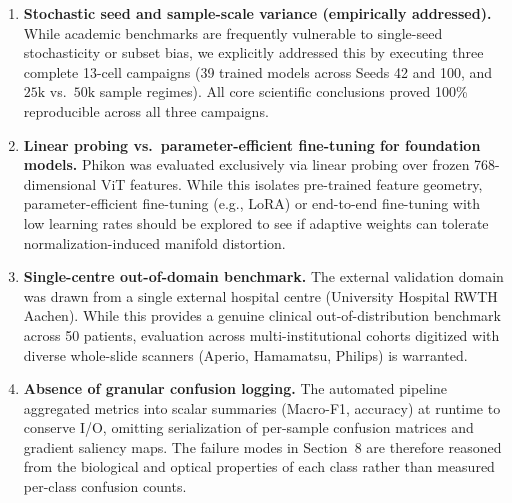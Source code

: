\documentclass[11pt,a4paper]{article}
\begin{document}
\begin{enumerate}
  \item \textbf{Stochastic seed and sample-scale variance (empirically addressed).}
        While academic benchmarks are frequently vulnerable to single-seed stochasticity
        or subset bias, we explicitly addressed this by executing three complete 13-cell
        campaigns (39 trained models across Seeds 42 and 100, and $25\text{k}$ vs.\
        $50\text{k}$ sample regimes). All core scientific conclusions proved 100\%
        reproducible across all three campaigns.
  \item \textbf{Linear probing vs.\ parameter-efficient fine-tuning for foundation
        models.} Phikon was evaluated exclusively via linear probing over frozen
        768-dimensional ViT features. While this isolates pre-trained feature geometry,
        parameter-efficient fine-tuning (e.g., LoRA) or end-to-end fine-tuning with low
        learning rates should be explored to see if adaptive weights can tolerate
        normalization-induced manifold distortion.
  \item \textbf{Single-centre out-of-domain benchmark.} The external validation domain
        was drawn from a single external hospital centre (University Hospital RWTH
        Aachen). While this provides a genuine clinical out-of-distribution benchmark
        across 50 patients, evaluation across multi-institutional cohorts digitized with
        diverse whole-slide scanners (Aperio, Hamamatsu, Philips) is warranted.
  \item \textbf{Absence of granular confusion logging.} The automated pipeline
        aggregated metrics into scalar summaries (Macro-F1, accuracy) at runtime to
        conserve I/O, omitting serialization of per-sample confusion matrices and
        gradient saliency maps. The failure modes in Section~8 are therefore reasoned
        from the biological and optical properties of each class rather than measured
        per-class confusion counts.
\end{enumerate}

\end{document}
